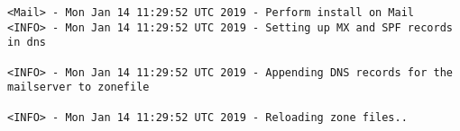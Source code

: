  \begin{lstlisting}[escapeinside=||]    
<Mail> - Mon Jan 14 11:29:52 UTC 2019 - Perform install on Mail                                                                                                                                                                                                                                                                               
<INFO> - Mon Jan 14 11:29:52 UTC 2019 - Setting up MX and SPF records in dns
                                                                                                                                                                                                                                                                                                                                              
<INFO> - Mon Jan 14 11:29:52 UTC 2019 - Appending DNS records for the mailserver to zonefile
                                                                                                                                                                                                                                                                                                                                              
<INFO> - Mon Jan 14 11:29:52 UTC 2019 - Reloading zone files..
                                                                                                                                                                                                                                                                                                                                              

\end{lstlisting}
